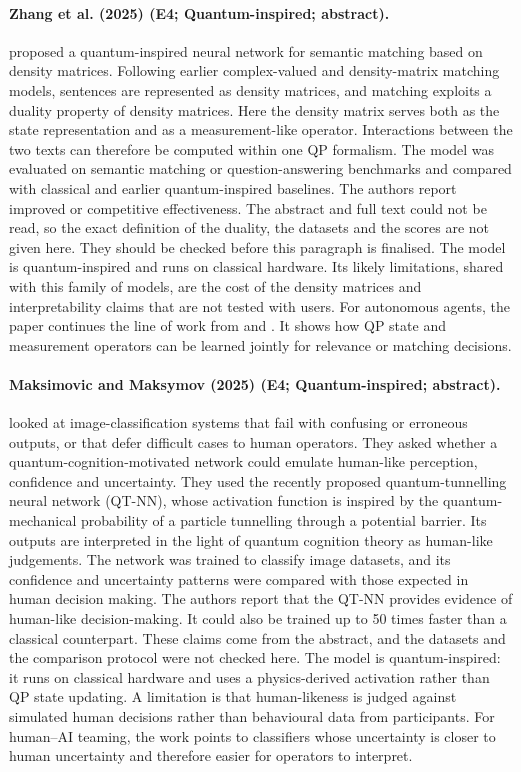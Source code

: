 \documentclass[10pt,a4paper]{article}
\begin{document}
\paragraph{Zhang et al. (2025) (E4; Quantum-inspired; abstract).} \citet{Zhang2025} proposed a quantum-inspired neural network for semantic matching based on density matrices. Following earlier complex-valued and density-matrix matching models, sentences are represented as density matrices, and matching exploits a duality property of density matrices. Here the density matrix serves both as the state representation and as a measurement-like operator. Interactions between the two texts can therefore be computed within one QP formalism. The model was evaluated on semantic matching or question-answering benchmarks and compared with classical and earlier quantum-inspired baselines. The authors report improved or competitive effectiveness. The abstract and full text could not be read, so the exact definition of the duality, the datasets and the scores are not given here. They should be checked before this paragraph is finalised. The model is quantum-inspired and runs on classical hardware. Its likely limitations, shared with this family of models, are the cost of the density matrices and interpretability claims that are not tested with users. For autonomous agents, the paper continues the line of work from \citep{Li2019} and \citep{Zhang2018}. It shows how QP state and measurement operators can be learned jointly for relevance or matching decisions.

\paragraph{Maksimovic and Maksymov (2025) (E4; Quantum-inspired; abstract).} \citet{Maksimovic2025} looked at image-classification systems that fail with confusing or erroneous outputs, or that defer difficult cases to human operators. They asked whether a quantum-cognition-motivated network could emulate human-like perception, confidence and uncertainty. They used the recently proposed quantum-tunnelling neural network (QT-NN), whose activation function is inspired by the quantum-mechanical probability of a particle tunnelling through a potential barrier. Its outputs are interpreted in the light of quantum cognition theory as human-like judgements. The network was trained to classify image datasets, and its confidence and uncertainty patterns were compared with those expected in human decision making. The authors report that the QT-NN provides evidence of human-like decision-making. It could also be trained up to 50 times faster than a classical counterpart. These claims come from the abstract, and the datasets and the comparison protocol were not checked here. The model is quantum-inspired: it runs on classical hardware and uses a physics-derived activation rather than QP state updating. A limitation is that human-likeness is judged against simulated human decisions rather than behavioural data from participants. For human--AI teaming, the work points to classifiers whose uncertainty is closer to human uncertainty and therefore easier for operators to interpret.
\end{document}
